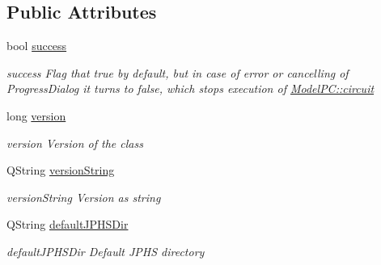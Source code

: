 \subsection*{Public Attributes}
\begin{DoxyCompactItemize}
\item 
bool \hyperlink{class_model_p_c_a945ffbbc44a832b953c191debd448f4c}{success}
\begin{DoxyCompactList}\small\item\em success Flag that true by default, but in case of error or cancelling of Progress\+Dialog it turns to false, which stops execution of \hyperlink{class_model_p_c_a1d0091062a0c836b283ec2f67411623b}{Model\+P\+C\+::circuit} \end{DoxyCompactList}\item 
long \hyperlink{class_model_p_c_a5af48ab89e19be42a94c34ba00249401}{version}
\begin{DoxyCompactList}\small\item\em version Version of the class \end{DoxyCompactList}\item 
Q\+String \hyperlink{class_model_p_c_a5f426725ccf7eefd3c77ea8c720264c9}{version\+String}
\begin{DoxyCompactList}\small\item\em version\+String Version as string \end{DoxyCompactList}\item 
Q\+String \hyperlink{class_model_p_c_abd038306f14f22fb885a1697c96d6335}{default\+J\+P\+H\+S\+Dir}
\begin{DoxyCompactList}\small\item\em default\+J\+P\+H\+S\+Dir Default J\+P\+HS directory \end{DoxyCompactList}\end{DoxyCompactItemize}
